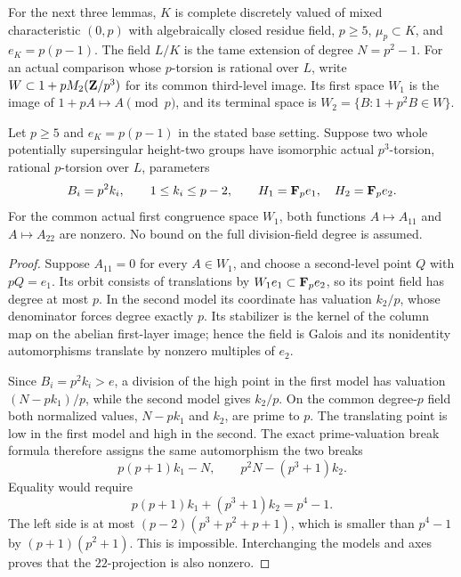For the next three lemmas, $K$ is complete discretely valued of mixed characteristic $(0,p)$ with algebraically closed residue field, $p\ge5$, $\mu_p\subset K$, and $e_K=p(p-1)$. The field $L/K$ is the tame extension of degree $N=p^2-1$. For an actual comparison whose $p$-torsion is rational over $L$, write $W\subset1+pM_2(\mathbf Z/p^3)$ for its common third-level image. Its first space $W_1$ is the image of $1+pA\mapsto A\pmod p$, and its terminal space is $W_2=\{B:1+p^2B\in W\}$.

\begin{lemma}\label{lem:first-layer-diagonal-visibility}
Let $p\ge5$ and $e_K=p(p-1)$ in the stated base setting. Suppose two whole potentially supersingular height-two groups have isomorphic actual $p^3$-torsion, rational $p$-torsion over $L$, parameters
\[
 B_i=p^2k_i,\qquad1\le k_i\le p-2,
 \qquad H_1=\mathbf F_pe_1,\quad H_2=\mathbf F_pe_2.
\]
For the common actual first congruence space $W_1$, both functions $A\mapsto A_{11}$ and $A\mapsto A_{22}$ are nonzero. No bound on the full division-field degree is assumed.
\end{lemma}
\begin{proof}
Suppose $A_{11}=0$ for every $A\in W_1$, and choose a second-level point $Q$ with $pQ=e_1$. Its orbit consists of translations by $W_1e_1\subset\mathbf F_pe_2$, so its point field has degree at most $p$. In the second model its coordinate has valuation $k_2/p$, whose denominator forces degree exactly $p$. Its stabilizer is the kernel of the column map on the abelian first-layer image; hence the field is Galois and its nonidentity automorphisms translate by nonzero multiples of $e_2$.

Since $B_i=p^2k_i>e$, a division of the high point in the first model has valuation $(N-pk_1)/p$, while the second model gives $k_2/p$. On the common degree-$p$ field both normalized values, $N-pk_1$ and $k_2$, are prime to $p$. The translating point is low in the first model and high in the second. The exact prime-valuation break formula therefore assigns the same automorphism the two breaks
\[
 p(p+1)k_1-N,\qquad p^2N-(p^3+1)k_2.
\]
Equality would require
\[
 p(p+1)k_1+(p^3+1)k_2=p^4-1.
\]
The left side is at most $(p-2)(p^3+p^2+p+1)$, which is smaller than $p^4-1$ by $(p+1)(p^2+1)$. This is impossible. Interchanging the models and axes proves that the $22$-projection is also nonzero.
\end{proof}

